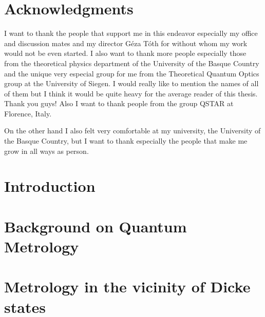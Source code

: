 \documentclass[12pt, letterpaper, twoside]{article}
\numberwithin{equation}{section}
\numberwithin{figure}{section}
\numberwithin{table}{section}
\begin{document}
\cleardoublepage

\section*{Acknowledgments}

I want to thank the people that support me in this endeavor especially my office and discussion mates and my director G\'eza T\'oth for without whom my work would not be even  started.
I also want to thank more people especially those from the theoretical physics department of the University of the Basque Country and the unique very especial group for me from the Theoretical Quantum Optics group at the University of Siegen.
I would really like to mention the names of all of them but I think it would be quite heavy for the average reader of this thesis.
Thank you guys!
Also I want to thank people from the group QSTAR at Florence, Italy.

On the other hand I also felt very comfortable at my university, the University of the Basque Country, but I want to thank especially the people that make me grow in all ways as person.

\cleardoublepage


\renewcommand{\headrulewidth}{0.5pt}
\fancyfoot[LE,RO]{\thepage}
\fancyhead[LE]{\rightmark}
\fancyhead[RO]{\leftmark}



\section{Introduction}




\section[Backgroud on Quantum Metrology]
{Background on Quantum Metrology}




\section[Quantum metrology with Dike like states]
{Metrology in the vicinity of Dicke states}

\end{document}
